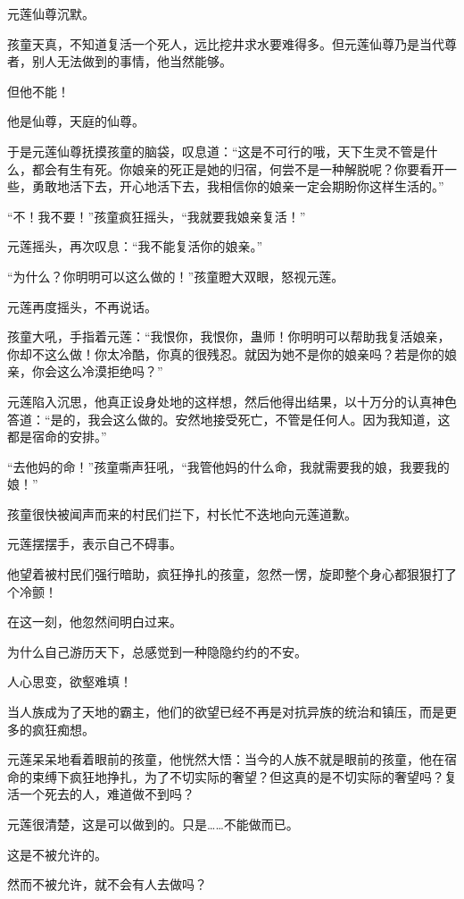 \begin{this_body}
元莲仙尊沉默。

孩童天真，不知道复活一个死人，远比挖井求水要难得多。但元莲仙尊乃是当代尊者，别人无法做到的事情，他当然能够。

但他不能！

他是仙尊，天庭的仙尊。

于是元莲仙尊抚摸孩童的脑袋，叹息道：“这是不可行的哦，天下生灵不管是什么，都会有生有死。你娘亲的死正是她的归宿，何尝不是一种解脱呢？你要看开一些，勇敢地活下去，开心地活下去，我相信你的娘亲一定会期盼你这样生活的。”

“不！我不要！”孩童疯狂摇头，“我就要我娘亲复活！”

元莲摇头，再次叹息：“我不能复活你的娘亲。”

“为什么？你明明可以这么做的！”孩童瞪大双眼，怒视元莲。

元莲再度摇头，不再说话。

孩童大吼，手指着元莲：“我恨你，我恨你，蛊师！你明明可以帮助我复活娘亲，你却不这么做！你太冷酷，你真的很残忍。就因为她不是你的娘亲吗？若是你的娘亲，你会这么冷漠拒绝吗？”

元莲陷入沉思，他真正设身处地的这样想，然后他得出结果，以十万分的认真神色答道：“是的，我会这么做的。安然地接受死亡，不管是任何人。因为我知道，这都是宿命的安排。”

“去他妈的命！”孩童嘶声狂吼，“我管他妈的什么命，我就需要我的娘，我要我的娘！”

孩童很快被闻声而来的村民们拦下，村长忙不迭地向元莲道歉。

元莲摆摆手，表示自己不碍事。

他望着被村民们强行暗助，疯狂挣扎的孩童，忽然一愣，旋即整个身心都狠狠打了个冷颤！

在这一刻，他忽然间明白过来。

为什么自己游历天下，总感觉到一种隐隐约约的不安。

人心思变，欲壑难填！

当人族成为了天地的霸主，他们的欲望已经不再是对抗异族的统治和镇压，而是更多的疯狂痴想。

元莲呆呆地看着眼前的孩童，他恍然大悟：当今的人族不就是眼前的孩童，他在宿命的束缚下疯狂地挣扎，为了不切实际的奢望？但这真的是不切实际的奢望吗？复活一个死去的人，难道做不到吗？

元莲很清楚，这是可以做到的。只是……不能做而已。

这是不被允许的。

然而不被允许，就不会有人去做吗？


\end{this_body}
